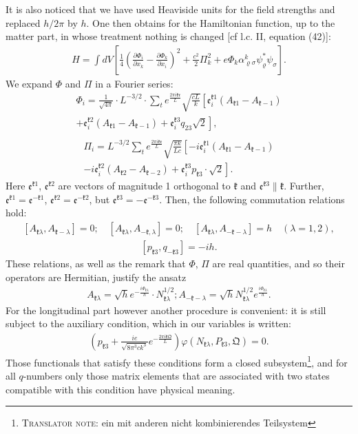 \documentclass[a4paper,11pt]{article}
\newcommand{\?}[2]{#1\footnote{\textsc{Translator note}: #2}}
\newcommand{\nequ}[2]{\begin{align*}\tag{#1}#2\end{align*}}
\renewcommand{\exp}[1]{e^{#1}}
\newcommand{\pXpY}[2]{\frac{\partial #1}{\partial #2}}
\newcommand{\mf}[1]{\mathfrak{#1}}
\begin{document}
It is also noticed that we have used Heaviside units for the field strengths and replaced $h/2\pi$ by $h$. One then obtains for the Hamiltonian function, up to the matter part, in whose treatment nothing is changed [cf l.c. II, equation (42)]:
\nequ{27}{
H = \int dV \left[\frac{1}{4}\left(\pXpY{\Phi_i}{x_k} - \pXpY{\Phi_k}{x_i}\right)^2 + \frac{c^2}{2}\Pi^2_k + e\Phi_k\alpha_{\varrho\sigma}^k\psi_\varrho^*\psi_\sigma\right].
}
We expand $\Phi$ and $\Pi$ in a Fourier series:
\nequ{28}{
\Phi_i = \frac{1}{\sqrt{4\pi}}\cdot L^{-3/2}\cdot\sum\limits_t\exp{\frac{2\pi i\mf{kr}}{L}}
\sqrt{\frac{cL}{k}}\left[\mf{e}_i^{\mf{k}1}(A_{\mf{k}1} - A_{\mf{k} - 1})\right.\\\left.
+ \mf{e}_i^{\mf{k}2}(A_{\mf{k}1} - A_{\mf{k} - 1})
+ \mf{e}_i^{\mf{k}3}q_{23}\sqrt{2}\right],\\
}
\nequ{29}{
\Pi_i = L^{-3/2}\sum\limits_t\exp{\frac{2\pi i \mf{kr}}{L}}
\sqrt{\frac{\pi k}{Lc}} \left[ -i\mf{e}_i^{\mf{k}1}
(A_{\mf{k}1} - A_{\mf{k} - 1})\right.\\ \left.
 - i\mf{e}_i^{\mf{k}2}(A_{\mf{k}2} - A_{\mf{k} - 2})
 + \mf{e}_i^{\mf{k}3} p_{\mf{k}3}\cdot \sqrt{2}\right].
}
Here $\mf{e}^{\mf{k}1}$, $\mf{e}^{\mf{k}2}$ are vectors of magnitude 1 orthogonal to $\mf{k}$ and $\mf{e}^{\mf{k}3}\parallel\mf{k}$. Further, $\mf{e}^{\mf{k}1} = \mf{e}^{-\mf{k}1}$, $\mf{e}^{\mf{k}2} = \mf{e}^{-\mf{k}2}$, but $\mf{e}^{\mf{k}3} = -\mf{e}^{-\mf{k}3}$. Then, the following commutation relations hold:
\nequ{30}{
\left[A_{\mf{k}\lambda}, A_{\mf{k}-\lambda}\right] = 0;\quad
\left[A_{\mf{k}\lambda}, A_{-\mf{k},\lambda}\right] = 0;\quad
\left[A_{\mf{k}\lambda}, A_{-\mf{k}-\lambda}\right] = h\quad (\lambda=1,2),
}
\nequ{30a}{
\left[p_{\mf{k}3}, q_{-\mf{k}3}\right] = -ih.
}
These relations, as well as the remark that $\Phi$, $\Pi$ are real quantities, and so their operators are Hermitian, justify the ansatz
\nequ{31}{
A_{\mf{k}\lambda} = \sqrt{h}\exp{-\frac{i\Phi_{\mf{k}\lambda}}{h}}
\cdot N_{\mf{k}\lambda}^{1/2};
A_{-\mf{k}-\lambda} = \sqrt{h}N_{\mf{k}\lambda}^{1/2}
\exp{\frac{i\Phi_{\mf{k}\lambda}}{h}}.
}
For the longitudinal part however another procedure is convenient: it is still subject to the auxiliary condition, which in our variables is written:
\nequ{32}{
\left(p_{\mf{k}3} + \frac{ie}{\sqrt{8\pi^3 c k^3}}
\exp{-\frac{2\pi i \mf{kQ}}{L}}\right)
\varphi\left(N_{\mf{k}\lambda}, P_{\mf{k}3}, \mf{Q}\right) = 0.
}
Those functionals that satisfy these conditions form \?{a closed subsystem}{ein mit anderen nicht kombinierendes Teilsystem}, and for all $q$-numbers only those matrix elements that are associated with two states compatible with this condition have physical meaning.
\end{document}
